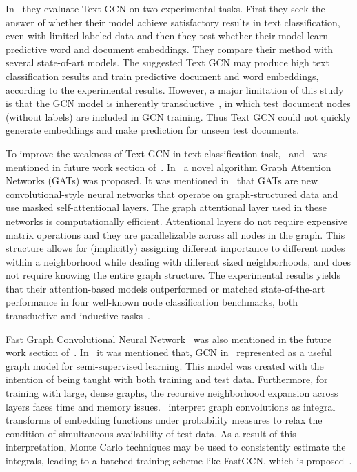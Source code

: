 In~\autocite{yao18graph} they evaluate Text GCN on two experimental tasks. First they seek the answer of whether their model achieve satisfactory results in text classification, even with limited labeled data and then they test whether their model learn predictive word and document embeddings. They compare their method with several state-of-art models. The suggested Text GCN may produce high text classification results and train predictive document and word embeddings, according to the experimental results. However, a major limitation of this study is that the GCN model is inherently transductive~\autocite{yao18graph}, in which test document nodes (without labels) are included in GCN training. Thus Text GCN could not quickly generate embeddings and make prediction for unseen test documents.

To improve the weakness of Text GCN in text classification task,~\autocite{velickovic18graph} and~\autocite{fastGCN2018} was mentioned in future work section of~\autocite{yao18graph}. In~\autocite{velickovic18graph} a novel algorithm Graph Attention Networks (GATs) was proposed. It was mentioned in~\autocite{velickovic18graph} that GATs are new convolutional-style neural networks that operate on graph-structured data and use masked self-attentional layers. The graph attentional layer used in these networks is computationally efficient. Attentional layers do not require expensive matrix operations and they are parallelizable across all nodes in the graph. This structure allows for (implicitly) assigning different importance to different nodes within a neighborhood while dealing with different sized neighborhoods, and does not require knowing the entire graph structure. The experimental results yields that their attention-based models outperformed or matched state-of-the-art performance in four well-known node classification benchmarks, both transductive and inductive tasks~\autocite{velickovic18graph}.

Fast Graph Convolutional Neural Network~\autocite{fastGCN2018} was also mentioned in the future work section of~\autocite{yao18graph}. In~\autocite{fastGCN2018} it was mentioned that, GCN in~\autocite{kipf17semisupervised} represented as a useful graph model for semi-supervised learning. This model was created with the intention of being taught with both training and test data. Furthermore, for training with large, dense graphs, the recursive neighborhood expansion across layers faces time and memory issues.~\autocite{fastGCN2018} interpret graph convolutions as integral transforms of embedding functions under probability measures to relax the condition of simultaneous availability of test data. As a result of this interpretation, Monte Carlo techniques may be used to consistently estimate the integrals, leading to a batched training scheme like FastGCN, which is proposed~\autocite{fastGCN2018}.

